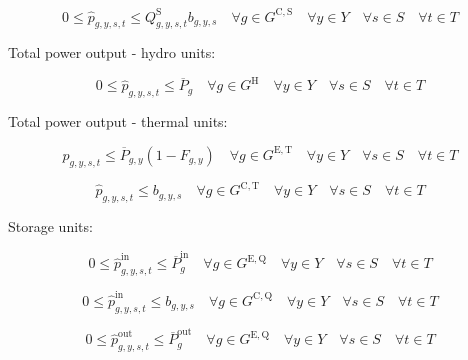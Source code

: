 \documentclass{article}
\newcommand{\sGeneratorsExistingThermal}{G^{\mathrm{E,T}}}
\newcommand{\sGeneratorsCandidateThermal}{G^{\mathrm{C,T}}}
\newcommand{\sGeneratorsCandidateSolar}{G^{\mathrm{C,S}}}
\newcommand{\sGeneratorsHydro}{G^{\mathrm{H}}}
\newcommand{\sStorageExisting}{G^{\mathrm{E,Q}}}
\newcommand{\sStorageCandidate}{G^{\mathrm{C,Q}}}
\newcommand{\sYears}{Y}
\newcommand{\sScenarios}{S}
\newcommand{\sIntervals}{T}
\newcommand{\iGenerator}{g}
\newcommand{\iYear}{y}
\newcommand{\iScenario}{s}
\newcommand{\iInterval}{t}
\newcommand{\cPowerOutputMax}[1][\iGenerator,\iYear]{\overline{P}_{#1}}
\newcommand{\cCapacityFactor}[1][\iGenerator,\iYear,\iScenario,\iInterval]{Q_{#1}}
\newcommand{\cPowerChargingMax}[1][\iGenerator]{\overline{P}^{\mathrm{in}}_{#1}}
\newcommand{\cPowerDischargingMax}[1][\iGenerator]{\overline{P}^{\mathrm{out}}_{#1}}
\newcommand{\cRetirementIndicator}[1][\iGenerator,\iYear]{F_{#1}}
\newcommand{\vPowerTotal}[1][\iGenerator,\iYear,\iScenario,\iInterval]{\hat{p}_{#1}}
\newcommand{\vPowerTotalIn}[1][\iGenerator,\iYear,\iScenario,\iInterval]{\hat{p}^{\mathrm{in}}_{#1}}
\newcommand{\vPowerTotalOut}[1][\iGenerator,\iYear,\iScenario,\iInterval]{\hat{p}^{\mathrm{out}}_{#1}}
\newcommand{\vInstalledCapacityTotalScenario}[1][\iGenerator,\iYear,\iScenario]{b_{#1}}
\begin{document}
\begin{equation}
0 \leq \vPowerTotal \leq \cCapacityFactor^{\mathrm{S}} \vInstalledCapacityTotalScenario \quad \forall \iGenerator \in \sGeneratorsCandidateSolar \quad \forall \iYear \in \sYears \quad \forall \iScenario \in \sScenarios \quad \forall \iInterval \in \sIntervals
\end{equation}

Total power output - hydro units:

\begin{equation}
0 \leq \vPowerTotal \leq \cPowerOutputMax[\iGenerator] \quad \forall \iGenerator \in \sGeneratorsHydro \quad \forall \iYear \in \sYears \quad \forall \iScenario \in \sScenarios \quad \forall \iInterval \in \sIntervals 
\end{equation}

Total power output - thermal units:

\begin{equation}
\vPowerTotal \leq \cPowerOutputMax \left(1 - \cRetirementIndicator \right) \quad \forall \iGenerator \in \sGeneratorsExistingThermal \quad \forall \iYear \in \sYears \quad \forall \iScenario \in \sScenarios \quad \forall \iInterval \in \sIntervals
\end{equation}

\begin{equation}
\vPowerTotal \leq \vInstalledCapacityTotalScenario \quad \forall \iGenerator \in \sGeneratorsCandidateThermal \quad \forall \iYear \in \sYears \quad \forall \iScenario \in \sScenarios \quad \forall \iInterval \in \sIntervals
\end{equation}

Storage units:

\begin{equation}
0 \leq \vPowerTotalIn \leq \cPowerChargingMax \quad \forall \iGenerator \in \sStorageExisting \quad \forall \iYear \in \sYears \quad \forall \iScenario \in \sScenarios \quad \forall \iInterval \in \sIntervals
\end{equation}

\begin{equation}
0 \leq \vPowerTotalIn \leq \vInstalledCapacityTotalScenario \quad \forall \iGenerator \in \sStorageCandidate \quad \forall \iYear \in \sYears \quad \forall \iScenario \in \sScenarios \quad \forall \iInterval \in \sIntervals
\end{equation}

\begin{equation}
0 \leq \vPowerTotalOut \leq \cPowerDischargingMax \quad \forall \iGenerator \in \sStorageExisting \quad \forall \iYear \in \sYears \quad \forall \iScenario \in \sScenarios \quad \forall \iInterval \in \sIntervals
\end{equation}
\end{document}
